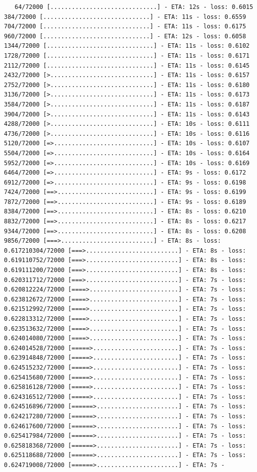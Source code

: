 \documentclass[12pt,fleqn]{article}\usepackage{../../common}
\begin{document}
\begin{verbatim}
   64/72000 [..............................] - ETA: 12s - loss: 0.6015  384/72000 [..............................] - ETA: 11s - loss: 0.6559  704/72000 [..............................] - ETA: 11s - loss: 0.6175  960/72000 [..............................] - ETA: 12s - loss: 0.6058 1344/72000 [..............................] - ETA: 11s - loss: 0.6102 1728/72000 [..............................] - ETA: 11s - loss: 0.6171 2112/72000 [..............................] - ETA: 11s - loss: 0.6145 2432/72000 [>.............................] - ETA: 11s - loss: 0.6157 2752/72000 [>.............................] - ETA: 11s - loss: 0.6180 3136/72000 [>.............................] - ETA: 11s - loss: 0.6173 3584/72000 [>.............................] - ETA: 11s - loss: 0.6187 3904/72000 [>.............................] - ETA: 11s - loss: 0.6143 4288/72000 [>.............................] - ETA: 10s - loss: 0.6111 4736/72000 [>.............................] - ETA: 10s - loss: 0.6116 5120/72000 [=>............................] - ETA: 10s - loss: 0.6107 5504/72000 [=>............................] - ETA: 10s - loss: 0.6164 5952/72000 [=>............................] - ETA: 10s - loss: 0.6169 6464/72000 [=>............................] - ETA: 9s - loss: 0.6172  6912/72000 [=>............................] - ETA: 9s - loss: 0.6198 7424/72000 [==>...........................] - ETA: 9s - loss: 0.6199 7872/72000 [==>...........................] - ETA: 9s - loss: 0.6189 8384/72000 [==>...........................] - ETA: 8s - loss: 0.6210 8832/72000 [==>...........................] - ETA: 8s - loss: 0.6217 9344/72000 [==>...........................] - ETA: 8s - loss: 0.6208 9856/72000 [===>..........................] - ETA: 8s - loss: 0.617210304/72000 [===>..........................] - ETA: 8s - loss: 0.619110752/72000 [===>..........................] - ETA: 8s - loss: 0.619111200/72000 [===>..........................] - ETA: 8s - loss: 0.620311712/72000 [===>..........................] - ETA: 7s - loss: 0.620812224/72000 [====>.........................] - ETA: 7s - loss: 0.623812672/72000 [====>.........................] - ETA: 7s - loss: 0.621512992/72000 [====>.........................] - ETA: 7s - loss: 0.622813312/72000 [====>.........................] - ETA: 7s - loss: 0.623513632/72000 [====>.........................] - ETA: 7s - loss: 0.624014080/72000 [====>.........................] - ETA: 7s - loss: 0.624014528/72000 [=====>........................] - ETA: 7s - loss: 0.623914848/72000 [=====>........................] - ETA: 7s - loss: 0.624515232/72000 [=====>........................] - ETA: 7s - loss: 0.625415680/72000 [=====>........................] - ETA: 7s - loss: 0.625816128/72000 [=====>........................] - ETA: 7s - loss: 0.624316512/72000 [=====>........................] - ETA: 7s - loss: 0.624516896/72000 [======>.......................] - ETA: 7s - loss: 0.624217280/72000 [======>.......................] - ETA: 7s - loss: 0.624617600/72000 [======>.......................] - ETA: 7s - loss: 0.625417984/72000 [======>.......................] - ETA: 7s - loss: 0.625818368/72000 [======>.......................] - ETA: 7s - loss: 0.625118688/72000 [======>.......................] - ETA: 7s - loss: 0.624719008/72000 [======>.......................] - ETA: 7s - 
\end{verbatim}
\end{document}
